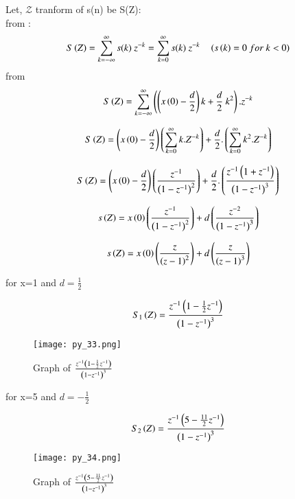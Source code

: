 \documentclass[beamer]{IEEEtran}
\theoremstyle{remark}
\begin{document}
Let, $\mathcal{Z}$ tranform of s(n) be S(Z):\\
from \brak{\ref{q11}}:
$$S\brak{Z}=\sum_{k=-\infty}^{\infty}s(k)\ z^{-k}=\sum_{k=0}^{\infty}s(k)\ z^{-k}\quad \brak{s\brak{k}=0\ for\ k<0}$$
from \brak{\ref{q9}}
\begin{align}
S\brak{Z}=\sum_{k=-\infty}^{\infty}\left(\brak{x\brak{0}-\frac{d}{2}}k+\frac{d}{2}\ k^2\right).z^{-k}
\end{align}

\begin{align}
\label{q17}
    S\left(Z\right)=\left(x\left(0\right)-\frac{d}{2}\right)\left(\sum_{k=0}^{\infty}k.Z^{-k}\right)+\frac{d}{2}.\left(\sum_{k=0}^{\infty}k^2.Z^{-k}\right)
\end{align}

\begin{align}
    S\left(Z\right)=\left(x\left(0\right)-\frac{d}{2}\right)\left(\frac{z^{-1}}{\left(1-z^{-1}\right)^2}\right)+\frac{d}{2}.\left(\frac{z^{-1}\left(1+z^{-1}\right)}{\left(1-z^{-1}\right)^3}\right)
\end{align}

\begin{align}
s\left(Z\right)=x\left(0\right)\left(\frac{z^{-1}}{\left(1-z^{-1}\right)^2}\right)+d\left(\frac{z^{-2}}{\left(1-z^{-1}\right)^3}\right)
\end{align}

\begin{align}
\label{w1}
s\left(Z\right)=x\left(0\right)\left(\frac{z}{\left(z-1\right)^2}\right)+d\left(\frac{z}{\left(z-1\right)^3}\right)
\end{align}

for x=1 and $d=\frac{1}{2}$

\begin{align}S_1\left(Z\right)=\frac{z^{-1}\left(1-\frac{1}{2}z^{-1}\right)}{\left(1-z^{-1}\right)^3}\end{align}

\begin{figure}[h]
    \centering
    \texttt{[image: py\_33.png]}
    \label{fig:enter-label}
    \caption*{Graph of $\frac{z^{-1}\left(1-\frac{1}{2}z^{-1}\right)}{\left(1-z^{-1}\right)^3}$}
\end{figure}

for x=5 and $d=-\frac{1}{2}$

\begin{align}S_2\left(Z\right)=\frac{z^{-1}\left(5-\frac{11}{2}z^{-1}\right)}{\left(1-z^{-1}\right)^3}\end{align}

\begin{figure}[h]
    \centering
    \texttt{[image: py\_34.png]}
    \label{fig:enter-label}
    \caption*{Graph of $\frac{z^{-1}\left(5-\frac{11}{2}z^{-1}\right)}{\left(1-z^{-1}\right)^3}$}
\end{figure}
\end{document}
